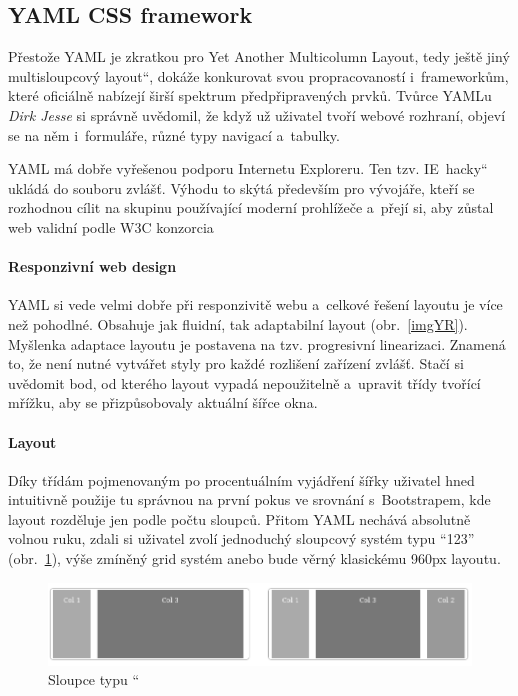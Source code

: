 \documentclass[thesis=B,czech]{FITthesis}[2012/06/26]
\begin{document}
\subsection{YAML CSS framework}

Přestože YAML je zkratkou pro Yet Another Multicolumn Layout, tedy \quotedblbase ještě jiný multisloupcový layout\textquotedblleft , dokáže konkurovat svou propracovaností i~frameworkům, které oficiálně nabízejí širší spektrum předpřipravených prvků. Tvůrce YAMLu \textit{Dirk Jesse} si správně uvědomil, že když už uživatel tvoří webové rozhraní, objeví se na něm i~formuláře, různé typy navigací a~tabulky. 

YAML má dobře vyřešenou podporu Internetu Exploreru. Ten tzv. \quotedblbase IE~hacky\textquotedblleft \\ukládá do souboru zvlášť. Výhodu to skýtá především pro vývojáře, kteří se rozhodnou cílit na skupinu používající moderní prohlížeče a~přejí si, aby zůstal web validní podle W3C konzorcia  

\paragraph{Responzivní web design}

YAML si vede velmi dobře při responzivitě webu a~celkové řešení layoutu je více než pohodlné. Obsahuje jak fluidní, tak adaptabilní layout (obr.~\ref{imgYR}). Myšlenka adaptace layoutu je postavena na tzv. progresivní linearizaci. Znamená to, že není nutné vytvářet styly pro každé rozlišení zařízení zvlášť. Stačí si uvědomit bod, od kterého layout vypadá nepoužitelně a~upravit třídy tvořící mřížku, aby se přizpůsobovaly aktuální šířce okna.





\paragraph{Layout}

Díky třídám pojmenovaným po procentuálním vyjádření šířky uživatel hned intuitivně použije tu správnou na první pokus ve srovnání s~Bootstrapem, kde layout rozděluje jen podle počtu sloupců. Přitom YAML nechává absolutně volnou ruku, zdali si uživatel zvolí jednoduchý sloupcový systém typu “123” (obr.~\ref{imgCol}), výše zmíněný grid systém anebo bude věrný klasickému 960px layoutu. 

\begin{figure}[h]
	\begin{center}
	\includegraphics[scale=0.6]{images/image05.png}
	\end{center}
	\caption{Sloupce typu \textquotedblleft \cite{yaml}}
	\label{imgCol}
\end{figure}
\end{document}
